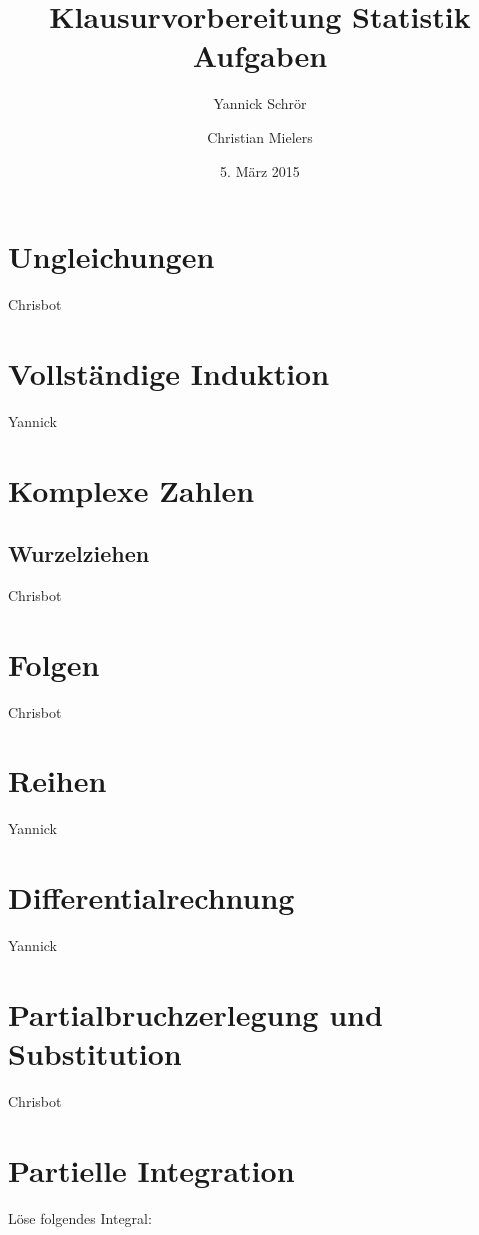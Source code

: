 \documentclass[11pt, a4paper]{article}
\title{Klausurvorbereitung Statistik \\ Aufgaben}
\author{Yannick Schrör \and Christian Mielers}
\date{5. März 2015}
\begin{document}
\maketitle

\section{Ungleichungen}
Chrisbot
\section{Vollständige Induktion}
Yannick
\section{Komplexe Zahlen}
\subsection{Wurzelziehen}
Chrisbot
\section{Folgen}
Chrisbot
\section{Reihen}
Yannick
\section{Differentialrechnung}
Yannick
\section{Partialbruchzerlegung und Substitution}
Chrisbot

\newpage
\section{Partielle Integration}

Löse folgendes Integral:

\newcommand{\lowerBorder}{{0}}
\newcommand{\upperBorder}{{\frac{1}{3}}}
\end{document}

